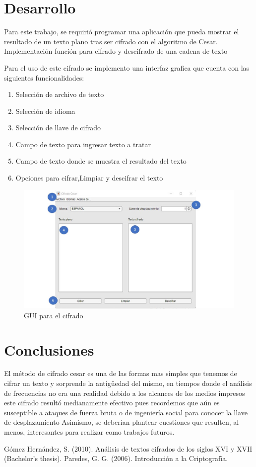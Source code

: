 \documentclass[journal,onecolumn]{IEEEtran}
\begin{document}
\section{Desarrollo}
Para este trabajo, se requirió programar una
aplicación que pueda mostrar el resultado de un texto
plano tras ser cifrado con el algoritmo de Cesar.\\
Implementación función para cifrado y descifrado de una cadena de texto

\newpage
Para el uso de este cifrado se implemento una interfaz grafica que cuenta con las siguientes funcionalidades:
\begin{enumerate}
    \item Selección de archivo de texto
    \item Selección de idioma
    \item Selección de llave de cifrado
    \item Campo de texto para ingresar texto a tratar
    \item Campo de texto donde se muestra el resultado del texto
    \item Opciones para cifrar,Limpiar y descifrar el texto
\end{enumerate}

\begin{figure}[!ht]
    \centering
    \includegraphics[width=1\textwidth]{imgs/window1.jpg}
    \caption{GUI para el cifrado}
    \label{fig_sim}
    \end{figure}


\section{Conclusiones}
El método de cifrado cesar es una de las formas mas simples que tenemos de cifrar un texto y sorprende la antigüedad del mismo, en tiempos donde el análisis de frecuencias no era una realidad debido a los alcances de los medios impresos este cifrado resultó medianamente efectivo pues recordemos que aún es susceptible a ataques de fuerza bruta o de ingeniería social para conocer la llave de desplazamiento
Asimismo, se deberían plantear cuestiones que resulten, al menos, interesantes para
realizar como trabajos futuros.
\begin{thebibliography}{00}
Gómez Hernández, S. (2010). Análisis de textos cifrados de los siglos XVI y XVII (Bachelor's thesis).
 Paredes, G. G. (2006). Introducción a la Criptografía.
\end{thebibliography} 
\end{document}
